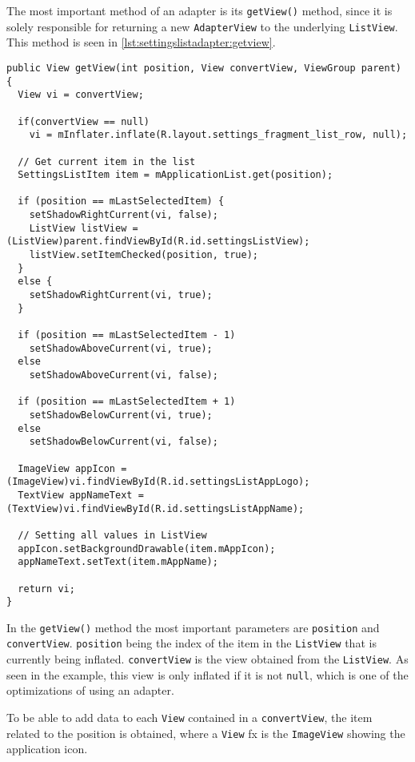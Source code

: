 The most important method of an adapter is its \lstinline|getView()| method, since it is solely responsible for returning a new \lstinline|AdapterView| to the underlying \lstinline|ListView|.
This method is seen in \cref{lst:settingslistadapter:getview}.

\begin{lstlisting}[caption={\lstinline|getView()| method in \lstinline|SettingsListAdapter| class.}, label={lst:settingslistadapter:getview}]
public View getView(int position, View convertView, ViewGroup parent) {
  View vi = convertView;
  
  if(convertView == null)
    vi = mInflater.inflate(R.layout.settings_fragment_list_row, null);
  
  // Get current item in the list
  SettingsListItem item = mApplicationList.get(position);
  
  if (position == mLastSelectedItem) {
    setShadowRightCurrent(vi, false);
    ListView listView = (ListView)parent.findViewById(R.id.settingsListView);
    listView.setItemChecked(position, true);
  }
  else {
    setShadowRightCurrent(vi, true);
  }
  
  if (position == mLastSelectedItem - 1)
    setShadowAboveCurrent(vi, true);
  else
    setShadowAboveCurrent(vi, false);
  
  if (position == mLastSelectedItem + 1)
    setShadowBelowCurrent(vi, true);
  else
    setShadowBelowCurrent(vi, false);
  
  ImageView appIcon = (ImageView)vi.findViewById(R.id.settingsListAppLogo);
  TextView appNameText = (TextView)vi.findViewById(R.id.settingsListAppName);
  
  // Setting all values in ListView
  appIcon.setBackgroundDrawable(item.mAppIcon);
  appNameText.setText(item.mAppName);
  
  return vi;
}
\end{lstlisting}

In the \lstinline|getView()| method the most important parameters are \lstinline|position| and \lstinline|convertView|.
\lstinline|position| being the index of the item in the \lstinline|ListView| that is currently being inflated.
\lstinline|convertView| is the view obtained from the \lstinline|ListView|.
As seen in the example, this view is only inflated if it is not \lstinline|null|, which is one of the optimizations of using an adapter.

To be able to add data to each \lstinline|View| contained in a \lstinline|convertView|, the item related to the position is obtained, where a \lstinline|View| fx is the \lstinline|ImageView| showing the application icon.

